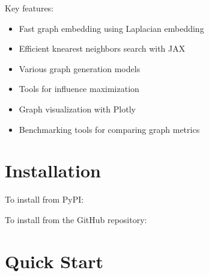 \documentclass[letterpaper,10pt,english]{sphinxmanual}
\begin{document}
\sphinxAtStartPar
Key features:
\begin{itemize}
\item {} 
\sphinxAtStartPar
Fast graph embedding using Laplacian embedding

\item {} 
\sphinxAtStartPar
Efficient k\sphinxhyphen{}nearest neighbors search with JAX

\item {} 
\sphinxAtStartPar
Various graph generation models

\item {} 
\sphinxAtStartPar
Tools for influence maximization

\item {} 
\sphinxAtStartPar
Graph visualization with Plotly

\item {} 
\sphinxAtStartPar
Benchmarking tools for comparing graph metrics

\end{itemize}


\chapter{Installation}
\label{\detokenize{index:installation}}
\sphinxAtStartPar
To install from PyPI:

\begin{sphinxVerbatim}[commandchars=\\\{\}]
  
\end{sphinxVerbatim}

\sphinxAtStartPar
To install from the GitHub repository:

\begin{sphinxVerbatim}[commandchars=\\\{\}]
  
\end{sphinxVerbatim}


\chapter{Quick Start}
\label{\detokenize{index:quick-start}}
\end{document}
